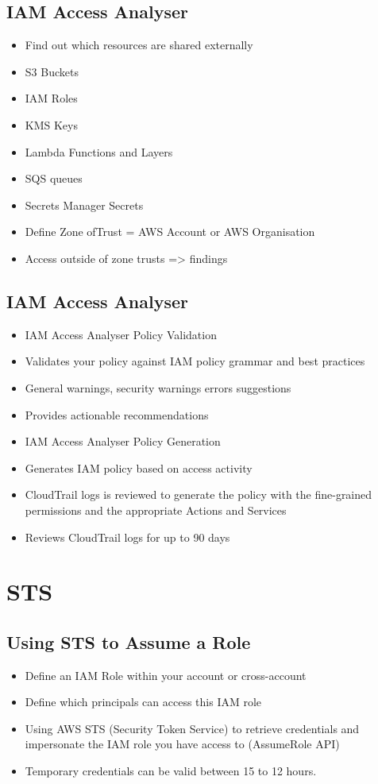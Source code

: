 \subsection{IAM Access Analyser}
\begin{itemize}
    \item Find out which resources are shared externally
    \item S3 Buckets
    \item IAM Roles
    \item KMS Keys
    \item Lambda Functions and Layers
    \item SQS queues
    \item Secrets Manager Secrets
    \item Define Zone ofTrust = AWS Account or AWS Organisation
    \item Access outside of zone trusts => findings
\end{itemize}

\subsection{IAM Access Analyser}
\begin{itemize}
    \item IAM Access Analyser Policy Validation
    \item Validates your policy against IAM policy grammar and best practices
    \item General warnings, security warnings errors suggestions
    \item Provides actionable recommendations
    \item IAM Access Analyser Policy Generation
    \item Generates IAM policy based on access activity
    \item CloudTrail logs is reviewed to generate the policy with the fine-grained permissions and the appropriate Actions and Services
    \item Reviews CloudTrail logs for up to 90 days
\end{itemize}


\section{STS}

\subsection{Using STS to Assume a Role}
\begin{itemize}
    \item Define an IAM Role within your account or cross-account
    \item Define which principals can access this IAM role
    \item Using AWS STS (Security Token Service) to retrieve credentials and impersonate the IAM role you have access to (AssumeRole API)
    \item Temporary credentials can be valid between 15 to 12 hours.
\end{itemize}

